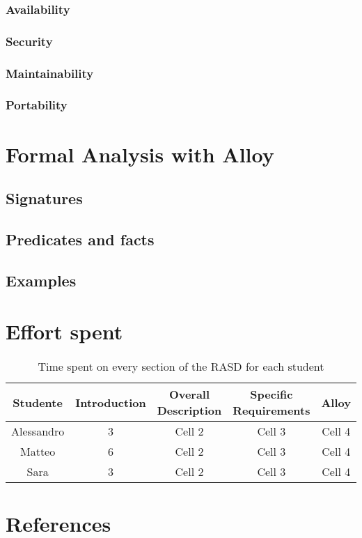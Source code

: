 \documentclass[12pt,a4paper]{article}
\begin{document}
\subsubsection{Availability}
\subsubsection{Security}
\subsubsection{Maintainability}
\subsubsection{Portability}
\section{Formal Analysis with Alloy}
\subsection{Signatures}
\subsection{Predicates and facts}
\subsection{Examples}
\section{Effort spent}
\begin{table}[h]
  \centering
  \begin{tabular}{|c|c|c|c|c|}
    \hline
     Studente & Introduction & Overall Description & Specific Requirements & Alloy \\
    \hline
    Alessandro & 3 & Cell 2 & Cell 3 & Cell 4 \\
    \hline
    Matteo & 6 & Cell 2 & Cell 3 & Cell 4 \\
    \hline
    Sara & 3 & Cell 2 & Cell 3 & Cell 4 \\
    \hline
  \end{tabular}
  \caption{Time spent on every section of the RASD for each student}
  \label{tab:effort}
\end{table}

\section{References}


\end{document}
